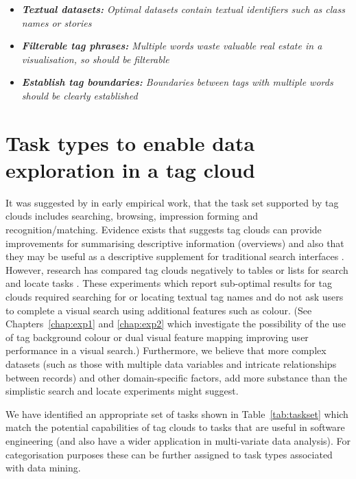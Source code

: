 \begin{itemize}
	\item \emph{\textbf{Textual datasets:} Optimal datasets contain textual identifiers such as class names or stories}
	\item \emph{\textbf{Filterable tag phrases:} Multiple words waste valuable real estate in a visualisation, so should be filterable}
	\item \emph{\textbf{Establish tag boundaries:} Boundaries between tags with multiple words should be clearly established}
\end{itemize}

\section{Task types to enable data exploration in a tag cloud}\label{sect:tasktypes}

It was suggested by \citet{rivadeneira07} in early empirical work, that the task set supported by tag clouds includes searching, browsing, impression forming and recognition/matching. Evidence exists that suggests tag clouds can provide improvements for summarising descriptive information (overviews) and also that they may be useful as a descriptive supplement for traditional search interfaces \citep{kuo07, sinclair08}. However, research has compared tag clouds negatively to tables or lists for search and locate tasks \citep[such as][]{oosterman10, halvey07, kuo07, rivadeneira07}. These experiments which report sub-optimal results for tag clouds required searching for or locating textual tag names and do not ask users to complete a visual search using additional features such as colour. (See Chapters~\ref{chap:exp1} and  \ref{chap:exp2} which investigate the possibility of the use of tag background colour or dual visual feature mapping improving user performance in a visual search.) Furthermore, we believe that more complex datasets (such as those with multiple data variables and intricate relationships between records) and other domain-specific factors, add more substance than the simplistic search and locate experiments might suggest. 

We have identified an appropriate set of tasks shown in Table~\vref{tab:taskset} which match the potential capabilities of tag clouds to tasks that are useful in software engineering (and also have a wider application in multi-variate data analysis). For categorisation purposes these can be further assigned to task types associated with data mining.

